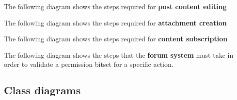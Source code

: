 \documentclass[12pt]{report}
\renewcommand\emph{\textbf}
\begin{document}

                \newpage

                The following diagram shows the steps required for \emph{post content editing}


                \newpage

                The following diagram shows the steps required for \emph{attachment creation}


                \newpage

                The following diagram shows the steps required for \emph{content subscription}


                \newpage

                The following diagram shows the steps that the \emph{forum system} must take in order to validate a permission bitset for a specific action.


                \newpage
                \newpage

            \subsection{Class diagrams}
\end{document}
